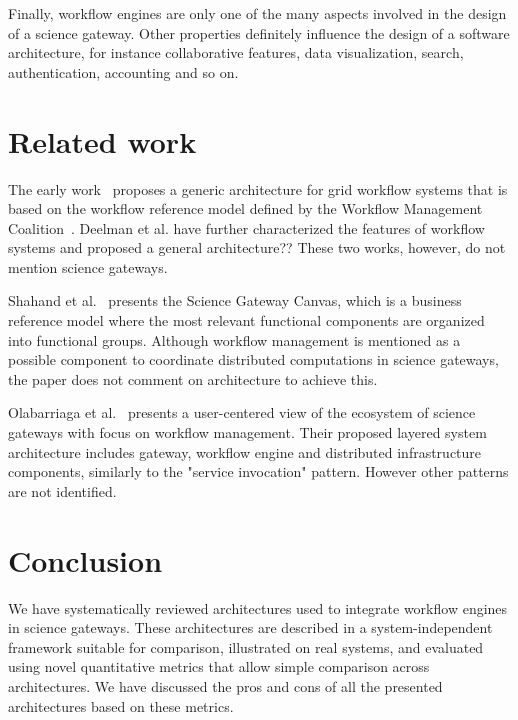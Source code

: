 \documentclass[preprint,3p,twocolumn]{elsarticle}
\newcommand{\note}[2]{\pdfmargincomment[color=yellow,author=#1,open=true]{#2}}
\newcommand{\closednote}[4]{} %
\newcommand{\closedanswerednote}[6]{}
\begin{document}
Finally, workflow engines are only one of the many aspects involved in
the design of a science gateway. Other properties definitely influence
the design of a software architecture, for instance collaborative
features, data visualization, search, authentication, accounting and
so on.
\closednote{sil}{do you want to refer to the science gateway canvas paper here?}{Tristan}{Done (by you) in the related work section.}

\section{Related work}
\label{sec:related}
 
The early work~\cite{yuTaxonomy} proposes a generic architecture for
grid workflow systems that is based on the workflow reference model
defined by the Workflow Management Coalition~\cite{wfRefModel}.
Deelman et al. \cite{deelman2009workflows} have further characterized
the features of workflow systems and proposed a general architecture??
These two works, however, do not mention science gateways.

Shahand et al.~\cite{shahand:2015ab} presents the Science Gateway
Canvas, which is a business reference model where the most relevant
functional components are organized into functional groups. Although
workflow management is mentioned as a possible component to coordinate
distributed computations in science gateways, the paper does not
comment on architecture to achieve this.

Olabarriaga et al.~\cite{olabarriaga2014} presents a user-centered
view of the ecosystem of science gateways with focus on workflow
management. Their proposed layered system architecture includes
gateway, workflow engine and distributed infrastructure components,
similarly to the "service invocation" pattern. However other patterns
are not identified.

\section{Conclusion}

We have systematically reviewed architectures used to integrate workflow engines in
science gateways. These architectures are described in a system-independent framework
suitable for comparison, illustrated on real systems, and evaluated using novel quantitative metrics that allow simple comparison across architectures. We have discussed the
pros and cons of all the presented architectures based on these metrics.
\closedanswerednote{Rafael}{One thing that is missing in the
  conclusion or the limitations section is to state that this work
  does not intend to quantify the amount of work required to develop
  science gateways using a specific architecture, but the goal is to
  highlight what are the main components and interactions for each
  architecture, and the main advantages and drawbacks. This should
  also be stated in the introduction.}{Tristan}{This is in
  contradiction with the metric on 'integration effort'. What do you
  think?}{Tristan}{Fixed, as discussed in github \#8.}
\end{document}
